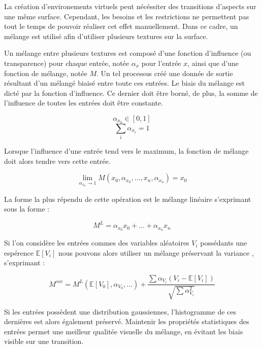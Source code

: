 \documentclass[9pt, twocolumn]{article} %
\begin{document}
La création d'environements virtuels peut nécéssiter des transitions d'aspects
sur une même surface. Cependant, les besoins et les restrictions ne permettent
pas tout le temps de pouvoir réaliser cet effet manuellement. Dans ce cadre, un
mélange est utilisé afin d'utiliser plusieurs textures sur la surface.

Un mélange entre plusieurs textures est composé d'une fonction d'influence (ou
transparence) pour chaque entrée, notée $\alpha_x$ pour l'entrée $x$, ainsi que
d'une fonction de mélange, notée $M$. Un tel processus créé une donnée de
sortie résultant d'un mélangé biaisé entre toute ces entrées. Le biais du
mélange est dicté par la fonction d'influence. Ce dernier doit être borné, de
plus, la somme de l'influence de toutes les entrées doit être constante.

\begin{equation}\label{AlphaBorne}
  \alpha_{x_0} \in [0, 1]
\end{equation}
\begin{equation}\label{AlphaConstant}
  \sum_i \alpha_{x_i} = 1
\end{equation}

Lorsque l'influence d'une entrée tend vers le maximum, la fonction de mélange
doit alors tendre vers cette entrée.

\begin{equation}\label{MixLimit}
  \lim_{\alpha_{x_0} \rightarrow 1} M(x_0, \alpha_{x_0}, \dots , x_n, \alpha_{x_n}) = x_0
\end{equation}

La forme la plus répendu de cette opération est le mélange linéaire s'exprimant
sous la forme :

\begin{equation}\label{MixLinear}
  M^{L} = \alpha_{x_0} x_0 + \dots + \alpha_{x_n} x_n
\end{equation}

Si l'on considère les entrées commes des variables aléatoires $V_i$ possédants
une espérence $ \mathbb{E}[V_i] $ nous pouvons alors utiliser un mélange
préservant la variance \cite{HPnoise}, s'exprimant :

\begin{equation}\label{MixVariancePreserving}
  M^{cov}
  =
  M^{L}(\mathbb{E}[V_0], \alpha_{V_0}, \dots) + \frac {\sum \alpha_{V_i}(V_i
    - \mathbb{E}[V_i])} {\sqrt{\sum \alpha_{V_i}^2}}
\end{equation}

Si les entrées possèdent une distribution gaussiennes, l'histogramme de ces
dernières est alors également préservé. Maintenir les propriétés statistiques
des entrées permet une meilleur qualitée visuelle du mélange, en évitant les
biais visible sur une transition.
\end{document}
